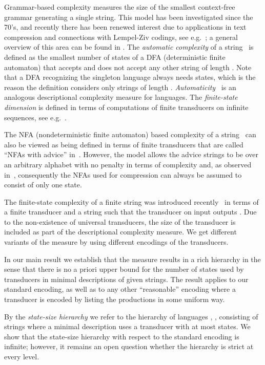 \documentclass[copyright]{eptcs}
\begin{document}
Grammar-based complexity measures the size of the smallest
context-free grammar generating a single string.
This model has been investigated since the 70's, and
recently there has been renewed interest 
due to applications in text compression and 
connections with Lempel-Ziv codings,
see e.g.~\cite{LS,Ry2}; a general overview
of this area can be found in
\cite{Le}. 
The {\em automatic complexity\/} of a string~\cite{SW} is
defined as the smallest
number of states of a DFA (deterministic finite
automaton) that accepts  and does not accept any
other string of length 
. Note that a DFA  recognizing the singleton language
  always needs   states, which is the reason
 the definition considers only strings of length . 
{\em Automaticity\/}~\cite{AS,SB} is an analogous descriptional
complexity measure for languages.
The {\em finite-state dimension\/} is defined in terms
of computations of finite transducers on infinite
sequences, see e.g.~\cite{BHV,DLN}.


The  NFA (nondeterministic finite automaton)
based complexity 
of a string~\cite{CLL} can also be viewed as being defined in terms of finite
transducers that are called  ``NFAs with advice''
in~\cite{CLL}.
However, the model allows the advice
strings to be over an arbitrary alphabet with no penalty
in terms of complexity and, as observed in~\cite{CLL},
consequently the NFAs used for compression can always be
assumed to consist of only one state.


The finite-state complexity of a finite string 
was introduced recently~\cite{CSR} 
in terms of a finite transducer and a string 
such that the transducer on input  outputs .
Due to the non-existence of  universal 
transducers, the size of the transducer is
included as part of the descriptional complexity 
measure. We get different variants of the measure
by using different encodings of the transducers.

In our main result we establish that the measure results in
a rich hierarchy in the sense that
there is no a priori
upper bound for the number of states used by transducers
in  minimal descriptions of given strings.
The result applies to our
standard encoding, as well as to any other ``reasonable'' encoding
where a transducer is encoded by listing the productions
in some uniform way.

By the {\em state-size hierarchy\/} we refer to the
hierarchy of languages , ,
consisting of strings where a minimal description uses
a transducer with at most  states. We show that the
state-size hierarchy with respect to the standard encoding
is infinite; however, it remains an open question whether
the hierarchy is strict at every level.
\end{document}

